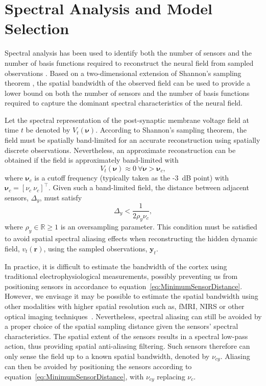 \documentclass[10pt,a4paper]{article}
\begin{document}
\section{Spectral Analysis and Model Selection}\label{SpectralAnalysisSection} Spectral analysis has been used to identify both the number of sensors and the number of basis functions required to reconstruct the neural field from sampled observations \cite{Sanner1992,Scerri2009}. Based on a two-dimensional extension of Shannon's sampling theorem \cite{Peterson1962}, the spatial bandwidth of the observed field can be used to provide a lower bound on both the number of sensors and the number of basis functions required to capture the dominant spectral characteristics of the neural field.

Let the spectral representation of the post-synaptic membrane voltage field at time $t$ be denoted by $V_t(\boldsymbol{\nu})$. According to Shannon's sampling theorem, the field must be spatially band-limited for an accurate reconstruction using spatially discrete observations. Nevertheless, an approximate reconstruction can be obtained if the field is approximately band-limited with 
\begin{equation}
	V_t(\boldsymbol{\nu}) \approx 0 ~ \forall \boldsymbol{\nu} > \boldsymbol{\nu}_c,
\end{equation}
where $\boldsymbol{\nu}_c$ is a cutoff frequency (typically taken as the -3~dB point) with $\boldsymbol{\nu}_c = [\nu_c ~ \nu_c]^\top$. Given such a band-limited field, the distance between adjacent sensors, $\Delta_y$, must satisfy 
\begin{equation}
	\label{eq:MinimumSensorDistance} \Delta_y < \frac{1}{2\rho_y\nu_{c}}, 
\end{equation}
where $\rho_y \in \mathbb{R} \ge 1$ is an oversampling parameter. This condition must be satisfied to avoid spatial spectral aliasing effects when reconstructing the hidden dynamic field, $v_t(\mathbf{r})$, using the sampled observations, $\mathbf{y}_t$.

In practice, it is difficult to estimate the bandwidth of the cortex using traditional electrophysiological measurements, possibly preventing us from positioning sensors in accordance to equation~\ref{eq:MinimumSensorDistance}. However, we envisage it may be possible to estimate the spatial bandwidth using other modalities with higher spatial resolution such as, fMRI, NIRS or other optical imaging techniques~\cite{Issa2000}. Nevertheless, spectral aliasing can still be avoided by a proper choice of the spatial sampling distance given the sensors' spectral characteristics. The spatial extent of the sensors results in a spectral low-pass action, thus providing spatial anti-aliasing filtering. Such sensors therefore can only sense the field up to a known spatial bandwidth, denoted by $\nu_{cy}$. Aliasing can then be avoided by positioning the sensors according to equation~\ref{eq:MinimumSensorDistance}, with $\nu_{cy}$ replacing $\nu_c$. 
\end{document}
